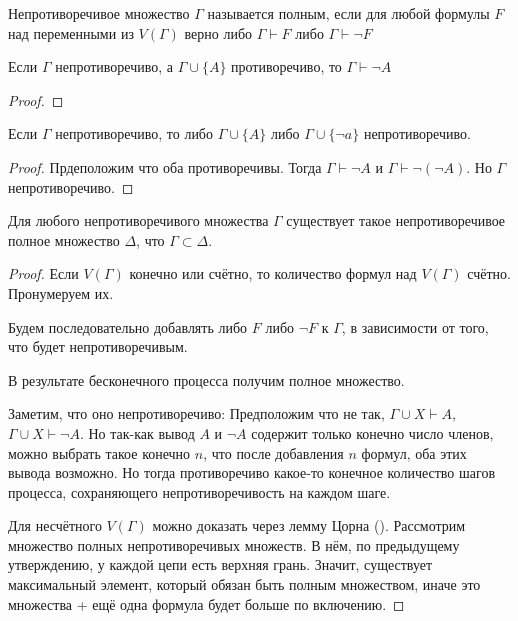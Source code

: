 \begin{definition} \thmslashn 

    Непротиворечивое множество $\Gamma$ называется полным, если для любой формулы $F$ над переменными из $V(\Gamma)$ верно либо $\Gamma \vdash F$ либо $\Gamma \vdash \neg F$
\end{definition}
\begin{lemma} \thmslashn

    Если $\Gamma$ непротиворечиво, а $\Gamma \cup \{A\}$ противоречиво, то $\Gamma \vdash \neg A$
    \begin{proof} \thmslashn
    
    \end{proof}
\end{lemma}
\begin{lemma} \thmslashn

    Если $\Gamma$ непротиворечиво, то либо $\Gamma \cup \{A\} $ либо $\Gamma \cup \{\neg a\} $ непротиворечиво.
    \begin{proof} \thmslashn
    
        Прдеположим что оба противоречивы. Тогда $\Gamma \vdash \neg A$ и $\Gamma \vdash \neg (\neg A)$. Но $\Gamma$ непротиворечиво.
    \end{proof}
\end{lemma}
\begin{lemma} \thmslashn

    Для любого непротиворечивого множества $\Gamma$ существует такое непротиворечивое полное множество $\Delta$, что $\Gamma \subset \Delta$.
    \begin{proof} \thmslashn
    
        Если $V(\Gamma)$ конечно или счётно, то количество формул над $V(\Gamma)$ счётно. Пронумеруем их.

        Будем последовательно добавлять либо $F$ либо $\neg F$ к $\Gamma$, в зависимости от того, что будет непротиворечивым.

        В результате бесконечного процесса получим полное множество.

        Заметим, что оно непротиворечиво: Предположим что не так, $\Gamma \cup X \vdash A$, $\Gamma \cup X \vdash \neg A$. Но так-как вывод $A$ и $\neg A$ содержит только конечно число членов, можно выбрать такое конечно $n$, что после добавления  $n$ формул, оба этих вывода возможно. Но тогда противоречиво какое-то конечное количество шагов процесса, сохраняющего непротиворечивость на каждом шаге.

        Для несчётного $V(\Gamma)$ можно доказать через лемму Цорна (). Рассмотрим множество полных непротиворечивых множеств. В нём, по предыдущему утверждению, у каждой цепи есть верхняя грань. Значит, существует максимальный элемент, который обязан быть полным множеством, иначе это множества + ещё одна формула будет больше по включению. 
    \end{proof}
\end{lemma}
